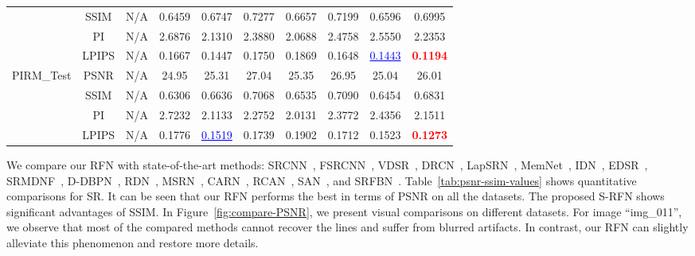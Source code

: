 \documentclass[preprint]{elsarticle}
\begin{document}
\begin{table*}[htpb]
\begin{center}
{\begin{tabular}{|c|c|c|c|c|c|c|c|c|c|}
			& SSIM & N/A & 0.6459 & 0.6747 & 0.7277 & 0.6657 & 0.7199 & 0.6596 & 0.6995\\
			& PI & N/A & 2.6876 & 2.1310 & 2.3880 & 2.0688 & 2.4758 & 2.5550 & 2.2353\\
			& LPIPS & N/A & 0.1667 & 0.1447 & 0.1750 & 0.1869 & 0.1648 & \textcolor{blue}{\underline{0.1443}} & \textcolor{red}{\textbf{0.1194}}\\
			\hline
			\multirow{4}{*}{PIRM\_Test} & PSNR & N/A & 24.95 & 25.31 & 27.04 & 25.35 & 26.95 & 25.04 & 26.01\\
			& SSIM & N/A & 0.6306 & 0.6636 & 0.7068 & 0.6535 & 0.7090 & 0.6454 & 0.6831\\
			& PI & N/A & 2.7232 & 2.1133 & 2.2752 & 2.0131 & 2.3772 & 2.4356 & 2.1511 \\
			& LPIPS & N/A & 0.1776 & \textcolor{blue}{\underline{0.1519}} & 0.1739 & 0.1902 & 0.1712 & 0.1523 & \textcolor{red}{\textbf{0.1273}} \\
			\hline
		\end{tabular} }
	\end{center}
	
\end{table*}




We compare our RFN with  state-of-the-art methods: SRCNN~\cite{SRCNN,SRCNN-Ex}, FSRCNN~\cite{FSRCNN}, VDSR~\cite{VDSR}, DRCN~\cite{DRCN}, LapSRN~\cite{LapSRN}, MemNet~\cite{MemNet}, IDN~\cite{IDN}, EDSR~\cite{EDSR}, SRMDNF~\cite{SRMDNF}, D-DBPN~\cite{DBPN}, RDN~\cite{RDN}, MSRN~\cite{MSRN}, CARN~\cite{CARN}, RCAN~\cite{RCAN}, SAN~\cite{SAN}, and SRFBN~\cite{SRFBN}. Table~\ref{tab:psnr-ssim-values} shows quantitative comparisons for  SR. It can be seen that our RFN performs the best in terms of PSNR on all the datasets. The proposed S-RFN shows significant advantages of SSIM. In Figure~\ref{fig:compare-PSNR}, we present visual comparisons on different datasets. For image ``img\_011'', we observe that most of the compared methods cannot recover the lines and suffer from blurred artifacts. In contrast, our RFN can slightly alleviate this phenomenon and restore more details. 
\end{document}
